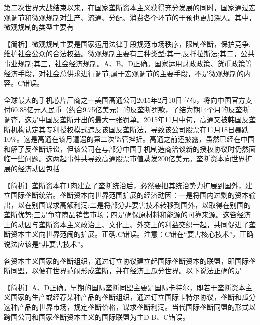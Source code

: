\question 第二次世界大战结束以来，在国家垄断资本主义获得充分发展的同时，国家通过宏观调节和微观规制对生产、流通、分配、消费各个环节的干预也更加深人。其中，微观规制的类型主要有
\par{}
\begin{solution}【简析】微观规制主要是国家运用法律手段规范市场秩序，限制垄断，保护竞争,维护社会公众的合法权益。微观规制主要有三种类型:其一,反托拉斯法;其二，公共事业规制;其三，社会经济规制。A、B、D正确。国家运用财政政策、货币政策等经济手段，对社会总供求进行调节,属于宏观调节的主要手段，不是微观规制的内容。C错误。
\end{solution}
\question 全球最大的手机芯片厂商之一美国髙通公司2015年2月10日宣布，将向中国官方支付60.88亿元人民币（约合9.75亿美元）的反垄断罚款，了结为期14个月的反垄断调査，这是中国反垄断开出的最大一张罚单。2015年11月中旬，高通又被韩国反垄断机构认定其专利授权模式违反该国反垄断法，导致该公司股票在11月18日暴跌10\%。这是高通在该月遭遇的第二次监管挫折。高通之前还披露，虽然已经在中国和解了反垄断诉讼，但该公司在与部分中国手机制造商洽谈新的授权协议时仍然面临一些问题。这两起事件共导致高通股票市值蒸发200亿美元。垄断资本向世界扩展的经济动因包括
\par{}
\begin{solution}【简析】垄断资本在1肉建立了垄断统治后，必然要把其统治势力扩展到国外，建立国际垄断统治。垄断资本向世界范围扩展的经济动因：一是将国内过剩的资本输出，以在别国谋求高额利润;二是将部分非要害技术转移到国外，以取得在别国的垄断优势;三是争夺商品销售市场；四是确保原材料和能源的可靠来源。这呰经济上的动因与垄断资本主义政治上、文化上、外交上的利益交织一起，共同促进了垄断资本主义向世界范闹的扩展。正确,C错误。注意：C错在``要害核心技术''，正确说法应该是``非要害技术''。
\end{solution}
\question 各资本主义国家的垄断组织，通过订立协议建立起国际垄断资本的联盟，即国际垄断同盟，以便在世界范闹形成垄断，并在经济上瓜分世界。以下说法正确的是
\par{}
\begin{solution}【简析】A、D正确。早期的国际垄断同盟主要是国际卡特尔，即若干垄断资本主义国家的生产或经荐某种产品的垄断组织，通过订立国际卡特尔协议，垄断和瓜分这种产品的世界市场，规定垄断价格，谋求垄断利润。当代国际垄断同盟的形式以跨国公司和国家垄断资本主义的国际联盟为主D
B、C错误。
\end{solution}
